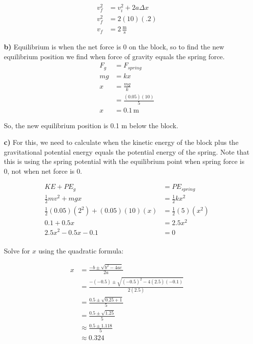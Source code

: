 \documentclass{article}
\begin{document}
\begin{align*}
    v_f^2 &= v_i^2 + 2a\Delta x \\
    v_f^2 &= 2(10)(.2) \\
    v_f &= 2\,\frac{\text{m}}{\text{s}}
\end{align*}

\vspace{1cm}
\large\textbf{b)} Equilibrium is when the net force is 0 on the block, so to find the new equilibrium position we find when force of gravity equals the spring force.
\begin{align*}
    F_{g} &= F_{spring} \\
    mg &= kx \\
    x &= \frac{mg}{k} \\
    &= \frac{(0.05)(10)}{5} \\ 
    x &= 0.1 \, \text{m}
\end{align*}

So, the new equilibrium position is 0.1 m below the block.

\vspace{1cm}
\large\textbf{c)} For this, we need to calculate when the kinetic energy of the block plus the gravitational potential energy equals the potential energy of the spring. Note that this is using the spring potential with the equilibrium point when spring force is 0, not when net force is 0.

\begin{align*}
    KE + PE_g &= PE_{spring}\\
    \frac{1}{2}mv^2 + mgx &= \frac{1}{2}kx^2 \\
    \frac{1}{2}(0.05)(2^2) + (0.05)(10)(x) &= \frac{1}{2}(5)(x^2) \\
    0.1 + 0.5x &= 2.5x^2 \\
    2.5x^2 - 0.5x - 0.1 &= 0 \\
\end{align*}

Solve for $x$ using the quadratic formula:

\begin{align*}
    x &= \frac{-b \pm \sqrt{b^2 - 4ac}}{2a} \\
    &= \frac{-(-0.5) \pm \sqrt{(-0.5)^2 - 4(2.5)(-0.1)}}{2(2.5)} \\
    &= \frac{0.5 \pm \sqrt{0.25 + 1}}{5} \\
    &= \frac{0.5 \pm \sqrt{1.25}}{5} \\
    &\approx \frac{0.5 \pm 1.118}{5} \\
    &\approx 0.324 \\
\end{align*}
\end{document}
